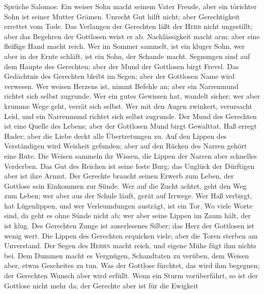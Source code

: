  Sprüche Salomos: Ein weiser Sohn macht seinem Vater
Freude, aber ein törichter Sohn ist seiner Mutter Grämen. 
Unrecht Gut hilft nicht; aber Gerechtigkeit errettet vom Tode.
 Das Verlangen der Gerechten läßt der \textsc{Herr} nicht
ungestillt; aber das Begehren der Gottlosen weist er ab. 
Nachlässigkeit macht arm; aber eine fleißige Hand macht reich.
 Wer im Sommer sammelt, ist ein kluger Sohn, wer aber in
der Ernte schläft, ist ein Sohn, der Schande macht. 
Segnungen sind auf dem Haupte des Gerechten; aber der Mund der Gottlosen
birgt Frevel.  Das Gedächtnis des Gerechten bleibt im
Segen; aber der Gottlosen Name wird verwesen.  Wer weisen
Herzens ist, nimmt Befehle an; aber ein Narrenmund richtet sich selbst
zugrunde.  Wer ein gutes Gewissen hat, wandelt sicher; wer
aber krumme Wege geht, verrät sich selbst.  Wer mit den
Augen zwinkert, verursacht Leid, und ein Narrenmund richtet sich selbst
zugrunde.  Der Mund des Gerechten ist eine Quelle des
Lebens; aber der Gottlosen Mund birgt Gewalttat.  Haß
erregt Hader; aber die Liebe deckt alle Übertretungen zu.
 Auf den Lippen des Verständigen wird Weisheit gefunden;
aber auf den Rücken des Narren gehört eine Rute.  Die
Weisen sammeln ihr Wissen, die Lippen der Narren aber schnelles
Verderben.  Das Gut des Reichen ist seine feste Burg; das
Unglück der Dürftigen aber ist ihre Armut.  Der Gerechte
braucht seinen Erwerb zum Leben, der Gottlose sein Einkommen zur Sünde.
 Wer auf die Zucht achtet, geht den Weg zum Leben; wer
aber aus der Schule läuft, gerät auf Irrwege.  Wer Haß
verbirgt, hat Lügenlippen, und wer Verleumdungen austrägt, ist ein Tor.
 Wo viele Worte sind, da geht es ohne Sünde nicht ab; wer
aber seine Lippen im Zaum hält, der ist klug.  Des
Gerechten Zunge ist auserlesenes Silber; das Herz der Gottlosen ist
wenig wert.  Die Lippen des Gerechten erquicken viele;
aber die Toren sterben am Unverstand.  Der Segen des
\textsc{Herrn} macht reich, und eigene Mühe fügt ihm nichts bei.
 Dem Dummen macht es Vergnügen, Schandtaten zu verüben,
dem Weisen aber, etwas Gescheites zu tun.  Was der
Gottlose fürchtet, das wird ihm begegnen; der Gerechten Wunsch aber wird
erfüllt.  Wenn ein Sturm vorüberfährt, so ist der
Gottlose nicht mehr da; der Gerechte aber ist für die Ewigkeit
